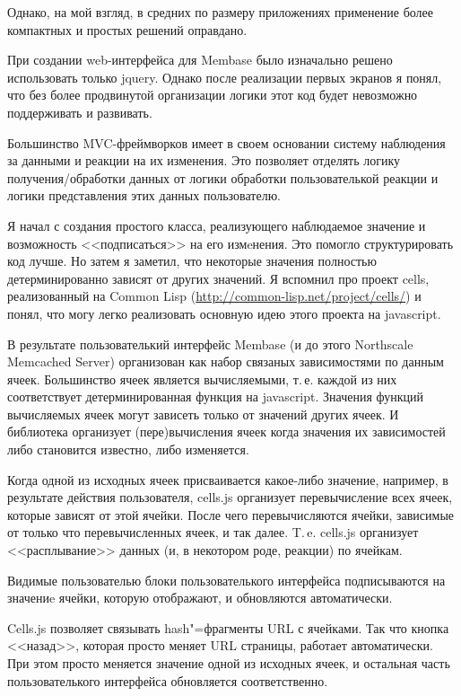 \documentclass[10pt, a5paper]{article}
\begin{document}
Однако, на мой взгляд, в средних по размеру приложениях применение более
компактных и простых решений оправдано.

При создании web-интерфейса для Membase было изначально решено
использовать только jquery. Однако после реализации первых экранов я
понял, что без более продвинутой организации логики этот код будет
невозможно поддерживать и развивать.

Большинство MVC-фреймворков имеет в своем основании систему наблюдения
за данными и реакции на их изменения. Это позволяет отделять логику
получения/обработки данных от логики обработки пользователькой реакции
и логики представления этих данных пользователю.

Я начал с создания простого класса, реализующего наблюдаемое значение и
возможность <<подписаться>> на его измeнения. Это помогло
структурировать код лучше. Но затем я заметил, что некоторые значения
полностью детерминированно зависят от других значений. Я вспомнил про
проект cells, реализованный на Common Lisp
(\url{http://common-lisp.net/project/cells/}) и понял, что могу легко
реализовать основную идею этого проекта на javascript.

В результате пользователький интерфейс Membase (и до этого Northscale
Memcached Server) организован как набор связаных зависимостями по
данным ячеек. Большинство ячеек является вычисляемыми, т.\,е. каждой из
них соответствует детерминированная функция на javascript. Значения
функций вычисляемых ячеек могут зависеть только от значений других
ячеек. И библиотека организует (пере)вычисления ячеек когда значения
их зависимостей либо становится известно, либо изменяется.

Когда одной из исходных ячеек присваивается какое-либо значение,
например, в результате действия пользователя, cells.js организует
перевычисление всех ячеек, которые зависят от этой ячейки. После чего
перевычисляются ячейки, зависимые от только что перевычисленных ячеек, и
так далее. T.\,e. cells.js организует <<расплывание>> данных (и, в
некотором роде, реакции) по ячейкам.

Видимые пользователью блоки пользователького интерфейса \linebreak подписываются
на значениe ячейки, которую отображают, и обновляются автоматически.

Cells.js позволяет связывать hash"=фрагменты URL с ячейками. Так что
кнопка <<назад>>, которая просто меняет URL страницы, работает
автоматически. При этом просто меняется значение одной из исходных
ячеек, и остальная часть пользователького интерфейса обновляется
соответственно.
\end{document}
